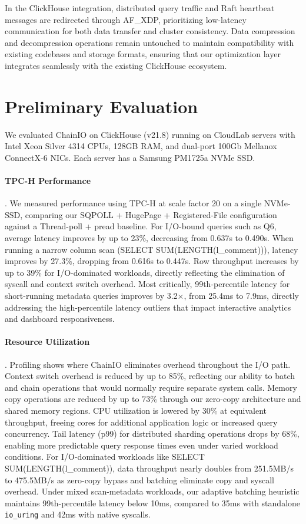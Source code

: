\documentclass[sigconf,10pt]{acmart}
\newcommand{\sys}{ChainIO\xspace}
\begin{document}
In the ClickHouse integration, distributed query traffic and Raft heartbeat messages are redirected through AF\_XDP, prioritizing low-latency communication for both data transfer and cluster consistency. Data compression and decompression operations remain untouched to maintain compatibility with existing codebases and storage formats, ensuring that our optimization layer integrates seamlessly with the existing ClickHouse ecosystem.

\section{Preliminary Evaluation}\label{sec:evaluation}

We evaluated \sys on ClickHouse (v21.8) running on CloudLab servers with Intel Xeon Silver 4314 CPUs, 128GB RAM, and dual-port 100Gb Mellanox ConnectX-6 NICs. Each server has a Samsung PM1725a NVMe SSD.

\paragraph{TPC-H Performance}. We measured performance using TPC-H at scale factor 20 on a single NVMe-SSD, comparing our SQPOLL + HugePage + Registered-File configuration against a Thread-poll + pread baseline. For I/O-bound queries such as Q6, average latency improves by up to 23\%, decreasing from 0.637s to 0.490s. When running a narrow column scan (SELECT SUM(LENGTH(l\_comment))), latency improves by 27.3\%, dropping from 0.616s to 0.447s. Row throughput increases by up to 39\% for I/O-dominated workloads, directly reflecting the elimination of syscall and context switch overhead. Most critically, 99th-percentile latency for short-running metadata queries improves by 3.2×, from 25.4ms to 7.9ms, directly addressing the high-percentile latency outliers that impact interactive analytics and dashboard responsiveness.

\paragraph{Resource Utilization}. Profiling shows where \sys eliminates overhead throughout the I/O path. Context switch overhead is reduced by up to 85\%, reflecting our ability to batch and chain operations that would normally require separate system calls. Memory copy operations are reduced by up to 73\% through our zero-copy architecture and shared memory regions. CPU utilization is lowered by 30\% at equivalent throughput, freeing cores for additional application logic or increased query concurrency. Tail latency (p99) for distributed sharding operations drops by 68\%, enabling more predictable query response times even under varied workload conditions. For I/O-dominated workloads like SELECT SUM(LENGTH(l\_comment)), data throughput nearly doubles from 251.5MB/s to 475.5MB/s as zero-copy bypass and batching eliminate copy and syscall overhead. Under mixed scan-metadata workloads, our adaptive batching heuristic maintains 99th-percentile latency below 10ms, compared to 35ms with standalone \texttt{io\_uring} and 42ms with native syscalls.



\end{document}
